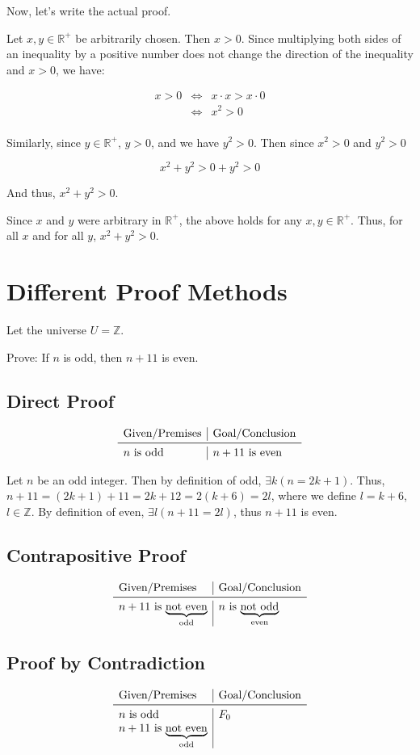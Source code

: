 \documentclass{article}
\begin{document}
Now, let's write the actual proof.

Let $x,y\in\mathbb{R}^+$ be arbitrarily chosen. Then $x>0$. Since
multiplying both sides of an inequality by a positive number does not
change the direction of the inequality and $x>0$, we have:

\[
\begin{array}{rcl}
x>0 & \Leftrightarrow & x \cdot x>x\cdot 0 \\
    & \Leftrightarrow & x^2 > 0 \\
\end{array}
\]

Similarly, since $y\in\mathbb{R}^+$, $y>0$, and we have $y^2>0$. Then
since $x^2>0$ and $y^2>0$

\[
x^2+y^2 > 0+y^2 > 0
\]

And thus, $x^2+y^2>0$.

Since $x$ and $y$ were arbitrary in $\mathbb{R}^+$, the above holds
for any $x,y\in\mathbb{R}^+$. Thus, for all $x$ and for all $y$,
$x^2+y^2>0$.

\section*{Different Proof Methods}

Let the universe $U=\mathbb{Z}$.

Prove: If $n$ is odd, then $n+11$ is even.

\subsection*{Direct Proof}

\[
\begin{array}{l|l}
\text{Given/Premises} & \text{Goal/Conclusion} \\
\midrule
\text{$n$ is odd} & \text{$n+11$ is even} \\
\end{array}
\]

Let $n$ be an odd integer. Then by definition of odd,
$\exists{}k(n=2k+1)$. Thus, $n+11=(2k+1)+11=2k+12=2(k+6)=2l$, where we
define $l=k+6$, $l\in\mathbb{Z}$. By definition of even,
$\exists{}l(n+11=2l)$, thus $n+11$ is even.

\subsection*{Contrapositive Proof}

\[
\begin{array}{l|l}
\text{Given/Premises} & \text{Goal/Conclusion} \\
\midrule
\text{$n+11$ is $\underbrace{\text{not even}}_{\text{odd}}$} & \text{$n$ is $\underbrace{\text{not odd}}_{\text{even}}$} \\
\end{array}
\]

\subsection*{Proof by Contradiction}

\[
\begin{array}{l|l}
\text{Given/Premises} & \text{Goal/Conclusion} \\
\midrule
\text{$n$ is odd} & F_0 \\
\text{$n+11$ is $\underbrace{\text{not even}}_{\text{odd}}$} & \\
\end{array}
\]
\end{document}
